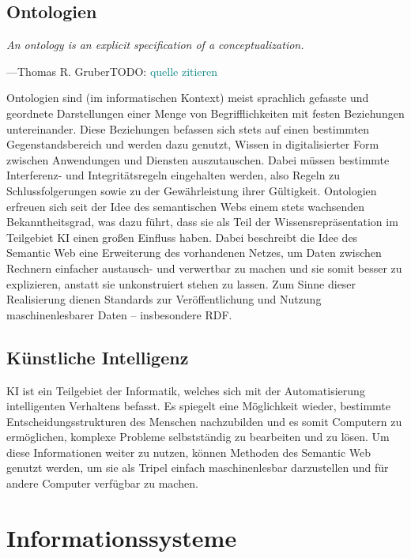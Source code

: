\documentclass[headsepline,titlepage,ngerman,twoside,12pt]{report}
\newcommand\todo[1]{TODO: \textcolor{teal}{#1}}
\begin{document}
\subsection {Ontologien}
\label{sub:ontologien}
\setlength{}
\setlength\epigraphrule{0pt}

\epigraph{\itshape An ontology is an explicit specification of a conceptualization.}{---Thomas R. Gruber\todo{quelle zitieren}}

\noindent Ontologien sind (im informatischen Kontext) meist sprachlich gefasste und geordnete Darstellungen einer Menge von Begrifflichkeiten mit festen Beziehungen untereinander.
Diese Beziehungen befassen sich stets auf einen bestimmten Gegenstandsbereich und werden dazu genutzt, Wissen in digitalisierter Form zwischen Anwendungen und Diensten auszutauschen.
Dabei müssen bestimmte Interferenz- und Integritätsregeln eingehalten werden, also Regeln zu Schlussfolgerungen sowie zu der Gewährleistung ihrer Gültigkeit.
Ontologien erfreuen sich seit der Idee des semantischen Webs einem stets wachsenden Bekanntheitsgrad, was dazu führt, dass sie als Teil der Wissensrepräsentation im Teilgebiet \acs{KI} einen großen Einfluss haben.
Dabei beschreibt die Idee des Semantic Web eine Erweiterung des vorhandenen Netzes, um Daten zwischen Rechnern einfacher austausch- und verwertbar zu machen und sie somit besser zu explizieren, anstatt sie unkonstruiert stehen zu lassen.
Zum Sinne dieser Realisierung dienen Standards zur Veröffentlichung und Nutzung maschinenlesbarer Daten -- insbesondere \ac{RDF}.

\subsection{Künstliche Intelligenz}
\label{sub:ki}

\ac{KI} ist ein Teilgebiet der Informatik, welches sich mit der Automatisierung intelligenten Verhaltens befasst.
Es spiegelt eine Möglichkeit wieder, bestimmte Entscheidungsstrukturen des Menschen nachzubilden und es somit Computern zu ermöglichen, komplexe Probleme selbstständig zu bearbeiten und zu lösen.
Um diese Informationen weiter zu nutzen, können Methoden des Semantic Web genutzt werden, um sie als Tripel einfach maschinenlesbar darzustellen und für andere Computer verfügbar zu machen.

\section{Informationssysteme}
\label{sec:informationssysteme}
\end{document}
